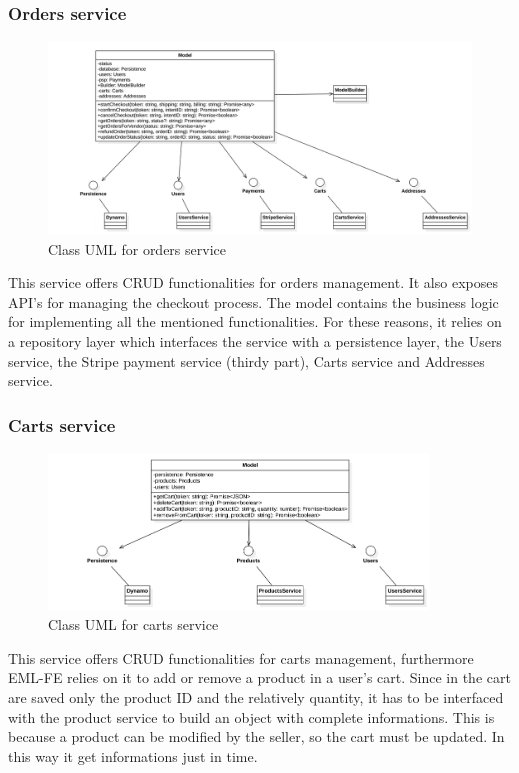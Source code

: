 \subsubsection{Orders service}
\begin{figure}[H]
    \includegraphics[width=\textwidth]{res/images/class-diagrams/orders.png}
    \caption{Class UML for orders service}
\end{figure}
This service offers CRUD functionalities for orders management. It also exposes API's for managing the checkout process.
The model contains the business logic for implementing all the mentioned functionalities. For these reasons, it relies on a repository layer
which interfaces the service with a persistence layer, the Users service, the Stripe payment service (thirdy part), Carts service and Addresses service.

\subsubsection{Carts service}
\begin{figure}[H]
    \includegraphics[width=0.9\textwidth]{res/images/class-diagrams/carts.png}
    \caption{Class UML for carts service}
\end{figure}
This service offers CRUD functionalities for carts management, furthermore EML-FE relies on it to add or remove a product in a user's cart.
Since in the cart are saved only the product ID and the relatively quantity, it has to be interfaced with the product service to build an object with complete informations.
This is because a product can be modified by the seller, so the cart must be updated. In this way it get informations just in time.

